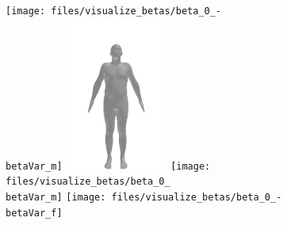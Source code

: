 \def\betaVar{3}
\def\imgWidth{0.3\textwidth}
\def\betaWidth{\textwidth}

\begin{figure}[ht!]
    \centering
    \begin{minipage}[b]{\textwidth}
        \centering
        \texttt{[image: files/visualize\_betas/beta\_0\_-\\betaVar\_m]}
        \includegraphics[width=\imgWidth]{files/visualize_betas/baseline_m}
        \texttt{[image: files/visualize\_betas/beta\_0\_\\betaVar\_m]}
        \linebreak
        \texttt{[image: files/visualize\_betas/beta\_0\_-\\betaVar\_f]}

\end{minipage}
\end{figure}
